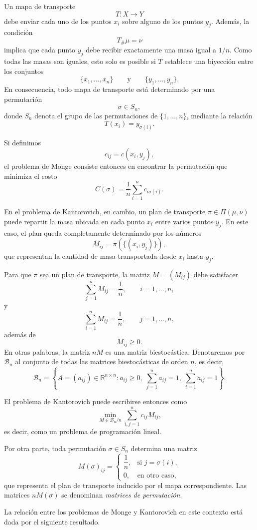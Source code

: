 \documentclass[12pt, a4paper]{amsbook}
\theoremstyle{remark}
\theoremstyle{definition}
\numberwithin{section}{chapter}
\numberwithin{subsection}{section}
\numberwithin{equation}{section}
\numberwithin{figure}{chapter}
\begin{document}
Un mapa de transporte
\[
T\colon X\to Y
\]
debe enviar cada uno de los puntos \(x_i\) sobre alguno de los puntos \(y_j\). Además, la condición
\[
T_\#\mu=\nu
\]
implica que cada punto \(y_j\) debe recibir exactamente una masa igual a \(1/n\). Como todas las masas son iguales, esto solo es posible si \(T\) establece una biyección entre los conjuntos
\[
\{x_1,\dots,x_n\}
\qquad\text{y}\qquad
\{y_1,\dots,y_n\}.
\]
En consecuencia, todo mapa de transporte está determinado por una permutación
\[
\sigma\in S_n,
\]
donde \(S_n\) denota el grupo de las permutaciones de \(\{1,\dots,n\}\), mediante la relación
\[
T(x_i)=y_{\sigma(i)}.
\]

Si definimos
\[
c_{ij}=c(x_i,y_j),
\]
el problema de Monge consiste entonces en encontrar la permutación que minimiza el costo
\[
C(\sigma)
=
\frac1n
\sum_{i=1}^n
c_{i\sigma(i)}.
\]

En el problema de Kantorovich, en cambio, un plan de transporte \(\pi\in\Pi(\mu,\nu)\) puede repartir la masa ubicada en cada punto \(x_i\) entre varios puntos \(y_j\). En este caso, el plan queda completamente determinado por los números
\[
M_{ij}=\pi(\{(x_i,y_j)\}),
\]
que representan la cantidad de masa transportada desde \(x_i\) hasta \(y_j\).

Para que \(\pi\) sea un plan de transporte, la matriz \(M=(M_{ij})\) debe satisfacer
\[
\sum_{j=1}^n M_{ij}=\frac1n,
\qquad
i=1,\dots,n,
\]
y
\[
\sum_{i=1}^n M_{ij}=\frac1n,
\qquad
j=1,\dots,n,
\]
además de
\[
M_{ij}\ge0.
\]
En otras palabras, la matriz \(nM\) es una matriz biestocástica. Denotaremos por
\(\mathcal B_n\) al conjunto de todas las matrices biestocásticas de orden \(n\), es decir,
\[
\mathcal B_n=
\left\{
A=(a_{ij})\in\mathbb R^{n\times n}\colon
a_{ij}\ge0,\;
\sum_{j=1}^n a_{ij}=1,\;
\sum_{i=1}^n a_{ij}=1
\right\}.
\]

El problema de Kantorovich puede escribirse entonces como
\[
\min_{M\in\mathcal B_n/n}
\sum_{i,j=1}^n c_{ij}M_{ij},
\]
es decir, como un problema de programación lineal.

Por otra parte, toda permutación \(\sigma\in S_n\) determina una matriz
\[
M(\sigma)_{ij}
=
\begin{cases}
\dfrac1n,&\text{si }j=\sigma(i),\\[1ex]
0,&\text{en otro caso},
\end{cases}
\]
que representa el plan de transporte inducido por el mapa correspondiente. Las matrices \(nM(\sigma)\) se denominan \emph{matrices de permutación}.

La relación entre los problemas de Monge y Kantorovich en este contexto está dada por el siguiente resultado.
\end{document}
